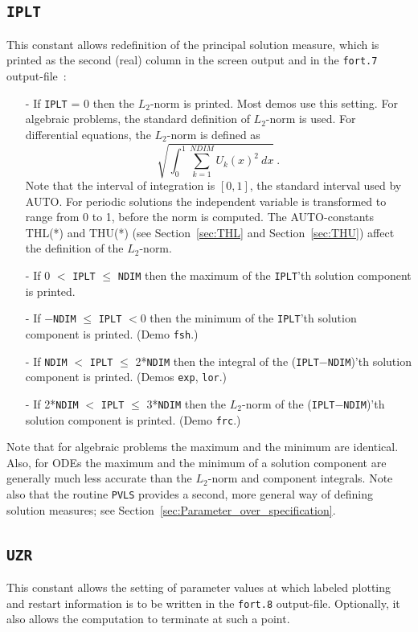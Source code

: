 \documentclass[12pt]{report}
\begin{document}
\subsection{\texttt{IPLT}}  \label{sec:IPLT}
 This constant allows redefinition of the principal solution measure, which is
 printed as the second (real) column in the screen output and in the {\tt fort.7}
 output-file~:
 
\begin{itemize}
\item[-]
  If {\tt IPLT} = 0 then the $L_2$-norm is printed. Most demos use this setting.
  For algebraic problems, the standard definition of $L_2$-norm is used.
  For differential equations, the $L_2$-norm is defined as 
  $$ \sqrt{ \int_0^1 \sum_{k=1}^{NDIM} U_k(x)^2 ~ dx}~.$$
  Note that the interval of integration is $[0,1]$, the standard interval
 used by AUTO. For periodic solutions the independent variable is transformed
 to range from 0 to 1, before the norm is computed. The AUTO-constants THL(*) 
 and THU(*) (see Section~\ref{sec:THL} and Section~\ref{sec:THU})
 affect the definition of the $L_2$-norm.
\item[-]
  If 0 $<$ {\tt IPLT} $\le$ {\tt NDIM} then the maximum of the {\tt IPLT}'th solution component 
  is printed.
\item[-]
  If $-${\tt NDIM} $\le$ {\tt IPLT} $<$0 then the minimum of the {\tt IPLT}'th solution component
  is printed.  (Demo {\tt fsh}.)
\item[-]
  If {\tt NDIM} $<$ {\tt IPLT} $\le$ 2*{\tt NDIM} then the integral 
  of the ({\tt IPLT}$-${\tt NDIM})'th 
  solution component is printed. (Demos {\tt exp}, {\tt lor}.)
\item[-]
  If 2*{\tt NDIM} $<$ {\tt IPLT} $\le$ 3*{\tt NDIM} 
  then the $L_2$-norm of the ({\tt IPLT}$-${\tt NDIM})'th 
  solution component is printed. (Demo {\tt frc}.)
\end{itemize}

Note that for algebraic problems the maximum and the minimum are identical.
Also, for ODEs the maximum and the minimum of a solution component are generally
much less accurate than the $L_2$-norm and component integrals.
Note also that the routine {\tt PVLS} provides a second, more general way
of defining solution measures; see Section~\ref{sec:Parameter_over_specification}.


\subsection{\texttt{UZR}} \label{sec:UZR} 
 This constant allows the setting of parameter values at which labeled plotting 
 and restart information is to be written in the {\tt fort.8} output-file.
 Optionally, it also allows the computation to terminate at such a point.
\end{document}
